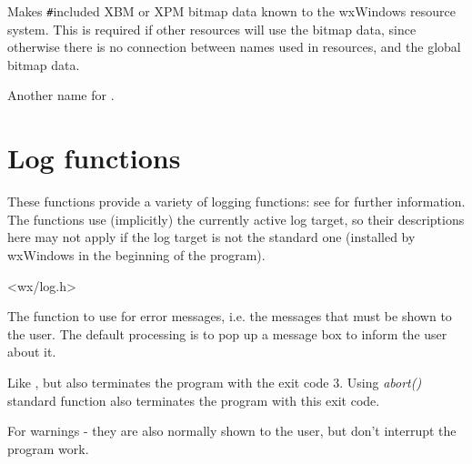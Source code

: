 
Makes \verb$#$included XBM or XPM bitmap data known to the wxWindows resource system. 
This is required if other resources will use the bitmap data, since otherwise there
is no connection between names used in resources, and the global bitmap data.


Another name for .

\section{Log functions}\label{logfunctions}

These functions provide a variety of logging functions: see  for
further information. The functions use (implicitly) the currently active log
target, so their descriptions here may not apply if the log target is not the
standard one (installed by wxWindows in the beginning of the program).


<wx/log.h>

\label{wxlogerror}


The function to use for error messages, i.e. the messages that must be shown
to the user. The default processing is to pop up a message box to inform the
user about it.

\label{wxlogfatalerror}


Like , but also
terminates the program with the exit code 3. Using {\it abort()} standard
function also terminates the program with this exit code.

\label{wxlogwarning}


For warnings - they are also normally shown to the user, but don't interrupt
the program work.

\label{wxlogmessage}


